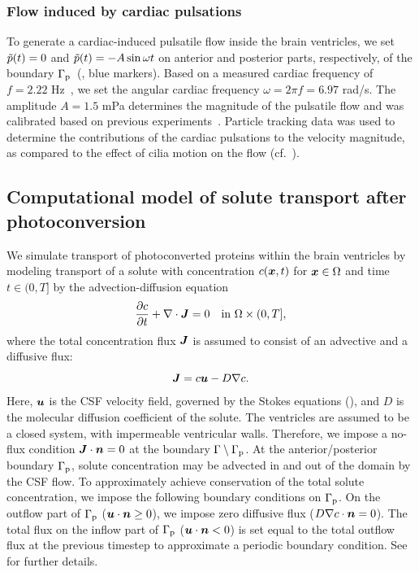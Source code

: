 \documentclass{WileyMSP-template}
\begin{document}
\subsubsection{Flow induced by cardiac pulsations}
To generate a cardiac-induced pulsatile flow inside the brain ventricles, we set $\Tilde{p}(t)=0$ and
$\Tilde{p}(t)=-A\sin{\omega t}$ on anterior and posterior parts, respectively, of the
boundary $\Gamma_{\mathrm{p}}$~(, blue markers).
Based on a measured cardiac frequency of $f=2.22$ Hz~\cite{Olstad2019CiliaryDevelopment},
we set the angular cardiac frequency $\omega=2\pi f=6.97$ rad/s. The amplitude $A=1.5$ mPa determines the magnitude of the pulsatile flow
and was calibrated based on previous experiments~\cite{Olstad2019CiliaryDevelopment}.
Particle tracking data was used to determine the contributions of the
cardiac pulsations to the velocity magnitude,
as compared to the effect of cilia motion on the flow (cf.~).

\subsection{Computational model of solute transport after photoconversion}
We simulate transport of photoconverted proteins within the brain ventricles by
modeling transport of a solute with concentration $c(\bm{x}, t)$ for $\bm{x}\in\Omega$ and
time $t\in(0, T]$ by the advection-diffusion equation
\begin{equation}
    \frac{\partial c}{\partial t} + \nabla\cdot\bm{J} = 0 \quad \text{in } \Omega\times(0, T],
    \label{eq:adv_diff_strong}
\end{equation}
where the total concentration flux $\bm{J}$ is assumed to consist of an advective and a diffusive flux:
\begin{equation*}
    \bm{J} = c\bm{u} - D\nabla c .
\end{equation*}
Here, $\bm{u}$ is the CSF velocity field, governed by the Stokes equations (),
and $D$ is the molecular diffusion coefficient of the solute. 
The ventricles are assumed to be a closed system,
with impermeable ventricular walls. Therefore, we impose a no-flux condition
$\bm{J}\cdot\bm{n}=0$ at the boundary $\Gamma\setminus\Gamma_{\mathrm{p}}$.
At the anterior/posterior boundary $\Gamma_{\mathrm{p}}$, solute concentration may be advected in and out
of the domain by the CSF flow. 
To approximately achieve conservation of the total solute concentration,
we impose the following boundary conditions on $\Gamma_{\mathrm{p}}$.
On the outflow part of $\Gamma_{\mathrm{p}}$ ($\bm{u}\cdot\bm{n}\geq 0$),
we impose zero diffusive flux ($D\nabla c\cdot\bm{n} = 0$).
The total flux on the inflow part of $\Gamma_{\mathrm{p}}$ ($\bm{u}\cdot\bm{n} < 0$) is 
set equal to the total outflow flux at the previous timestep
to approximate a periodic boundary condition.
See~ for further details.
\end{document}
